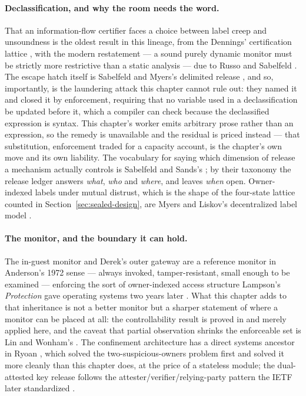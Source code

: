 \documentclass[11pt,a4paper]{article}
\theoremstyle{definition}
\begin{document}
\paragraph{Declassification, and why the room needs the word.}
That an information-flow certifier faces a choice between label creep and
unsoundness is the oldest result in this lineage, from the Dennings'
certification lattice , with the modern restatement --- a
sound purely dynamic monitor must be strictly more restrictive than a static
analysis --- due to Russo and Sabelfeld . The escape hatch itself
is Sabelfeld and Myers's delimited release , and so, importantly,
is the laundering attack this chapter cannot rule out: they named it and closed
it by enforcement, requiring that no variable used in a declassification be
updated before it, which a compiler can check because the declassified
expression is syntax. This chapter's worker emits arbitrary prose rather than
an expression, so the remedy is unavailable and the residual is priced instead
--- that substitution, enforcement traded for a capacity account, is the
chapter's own move and its own liability. The vocabulary for saying which
dimension of release a mechanism actually controls is Sabelfeld and Sands's
; by their taxonomy the release ledger answers \emph{what},
\emph{who} and \emph{where}, and leaves \emph{when} open. Owner-indexed labels
under mutual distrust, which is the shape of the four-state lattice counted in
Section~\ref{sec:sealed-design}, are Myers and Liskov's decentralized label
model .

\paragraph{The monitor, and the boundary it can hold.}
The in-guest monitor and Derek's outer gateway are a reference monitor in
Anderson's 1972 sense --- always invoked, tamper-resistant, small enough to be
examined  --- enforcing the sort of owner-indexed access
structure Lampson's \emph{Protection} gave operating systems two years later
. What this chapter adds to that inheritance is not a
better monitor but a sharper statement of where a monitor can be placed at all:
the controllability result is proved in  and merely applied here, and the caveat that partial observation
shrinks the enforceable set is Lin and Wonham's . The
confinement architecture has a direct systems ancestor in Ryoan
, which solved the two-suspicious-owners problem first and
solved it more cleanly than this chapter does, at the price of a stateless
module; the dual-attested key release follows the attester/verifier/relying-party
pattern the IETF later standardized .
\end{document}
